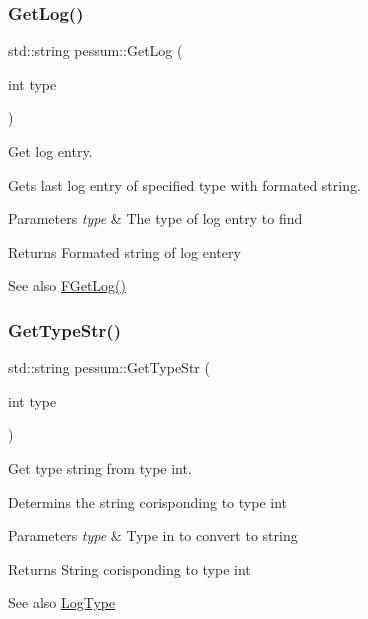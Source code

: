 \subsubsection{\texorpdfstring{Get\+Log()}{GetLog()}}
{\footnotesize\ttfamily std\+::string pessum\+::\+Get\+Log (\begin{DoxyParamCaption}\item[{int}]{type }\end{DoxyParamCaption})}



Get log entry. 

Gets last log entry of specified type with formated string. 
\begin{DoxyParams}{Parameters}
{\em type} & The type of log entry to find \\
\hline
\end{DoxyParams}
\begin{DoxyReturn}{Returns}
Formated string of log entery 
\end{DoxyReturn}
\begin{DoxySeeAlso}{See also}
\hyperlink{namespacepessum_ae7c3a2695cc96dc4f826e252d5dd4398}{F\+Get\+Log()} 
\end{DoxySeeAlso}
\mbox{\label{namespacepessum_a7a72cd1ada7b9736ebd7914ad5a9eedf}} 
\subsubsection{\texorpdfstring{Get\+Type\+Str()}{GetTypeStr()}}
{\footnotesize\ttfamily std\+::string pessum\+::\+Get\+Type\+Str (\begin{DoxyParamCaption}\item[{int}]{type }\end{DoxyParamCaption})}



Get type string from type int. 

Determins the string corisponding to type int 
\begin{DoxyParams}{Parameters}
{\em type} & Type in to convert to string \\
\hline
\end{DoxyParams}
\begin{DoxyReturn}{Returns}
String corisponding to type int 
\end{DoxyReturn}
\begin{DoxySeeAlso}{See also}
\hyperlink{namespacepessum_a0e205f64abc046e94dd38be906430664}{Log\+Type} 
\end{DoxySeeAlso}
\mbox{\label{namespacepessum_a92df65a763df879d6902d5c5c600f1d4}} 
